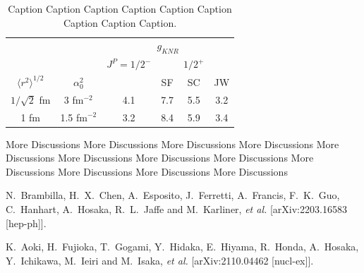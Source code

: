 \documentclass{snpyrs}
\newcommand{\ket}{\rangle}
\newcommand{\bra}{\langle}
\begin{document}
\begin{table}[h]
\centering
\caption{\label{widthp} \small Caption Caption Caption Caption Caption Caption Caption Caption Caption.  
}
\begin{tabular}{ c c | c c c c }
\hline
 &  & \multicolumn{4}{c}{$g_{KNR}$} \\
 &  & $J^P=1/2^-$ & & $1/2^+$ \\
\hline
$\bra r^2 \ket^{1/2}$ &  $\alpha_0^2$  &  & SF  &  SC  &  JW\\
$1/\sqrt{2}$ fm & 3 fm$^{-2}$ & 4.1 & 7.7 & 5.5 & 3.2\\
1 fm & 1.5 fm$^{-2}$ & 3.2 & 8.4 & 5.9 & 3.4\\
\hline
\end{tabular}
\end{table}

More Discussions More Discussions More Discussions More Discussions More Discussions More Discussions
More Discussions More Discussions More Discussions More Discussions More Discussions More Discussions




\begin{thebibliography}{9}
%
\vspace*{-0.2cm}
N.~Brambilla, H.~X.~Chen, A.~Esposito, J.~Ferretti, A.~Francis, F.~K.~Guo, C.~Hanhart, A.~Hosaka, R.~L.~Jaffe and M.~Karliner, \textit{et al.}
[arXiv:2203.16583 [hep-ph]].

\vspace*{-0.2cm}

K.~Aoki, H.~Fujioka, T.~Gogami, Y.~Hidaka, E.~Hiyama, R.~Honda, A.~Hosaka, Y.~Ichikawa, M.~Ieiri and M.~Isaka, \textit{et al.}
[arXiv:2110.04462 [nucl-ex]].

\end{thebibliography}
\end{document}
